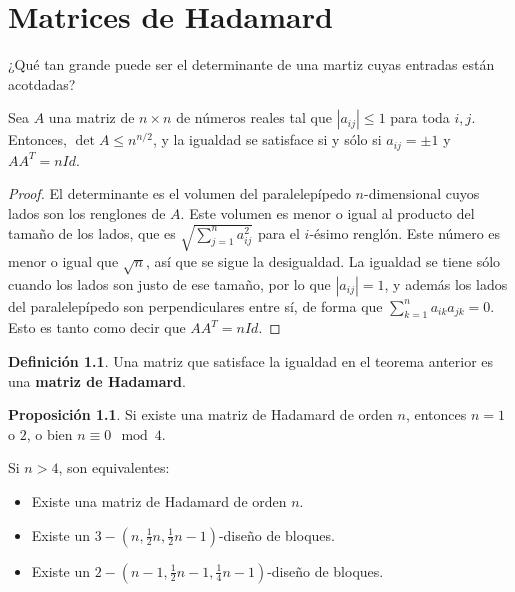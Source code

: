 \documentclass[spanish]{book}
\theoremstyle{definition}
\newtheorem*{defn}{Definición}
\newtheorem*{prop}{Proposición}
\begin{document}
\chapter{Matrices de Hadamard}
¿Qué tan grande puede ser el determinante de una martiz cuyas entradas están acotdadas?
\begin{teo}[de Hadamard]
	Sea $A$ una matriz de $n\times n$ de números reales tal que $|a_{ij}|\leq1$ para toda $i,j$. Entonces, $\det A\leq n^{n/2}$, y la igualdad se satisface si y sólo si $a_{ij}=\pm1$ y $AA^T=nId$.
\end{teo}
\begin{proof}
	El determinante es el volumen del paralelepípedo $n$-dimensional cuyos lados son los renglones de $A$. Este volumen es menor o igual al producto del tamaño de los lados, que es $\sqrt{\sum_{j=1}^n a_{ij}^2}$ para el $i$-ésimo renglón. Este número es menor o igual que $\sqrt{n}$, así que se sigue la desigualdad. La igualdad se tiene sólo cuando los lados son justo de ese tamaño, por lo que $|a_{ij}|=1$, y además los lados del paralelepípedo son perpendiculares entre sí, de forma que $\sum_{k=1}^na_{ik}a_{jk}=0$. Esto es tanto como decir que $AA^T=nId$.
\end{proof}
\begin{defn}
	Una matriz que satisface la igualdad en el teorema anterior es una \textbf{matriz de Hadamard}.
\end{defn}
\begin{prop}
	Si existe una matriz de Hadamard de orden $n$, entonces $n=1$ o $2$, o bien $n\equiv0\mod4$.
\end{prop}
\begin{teo}
	Si $n>4$, son equivalentes:
	\begin{itemize}
		\item Existe una matriz de Hadamard de orden $n$.
		\item Existe un $3-(n,\frac{1}{2}n,\frac{1}{2}n-1)$-diseño de bloques.
		\item Existe un $2-(n-1,\frac{1}{2}n-1,\frac{1}{4}n-1)$-diseño de bloques.
	\end{itemize}
\end{teo}
\end{document}
